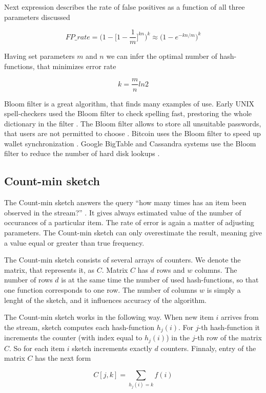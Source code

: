 Next expression describes the rate of false positives as a function of all three parameters discussed

$$
FP\_rate = \Bigg(1 - \Bigg[1 - \frac{1}{m}\Bigg]^{kn}\Bigg)^k \approx \Big(1 - e^{-kn/m}\Big)^k
$$

Having set parameters $m$ and $n$ we can infer the optimal number of hash-functions, that minimizes error rate

$$
k = \frac{m}{n}ln2
$$

Bloom filter is a great algorithm, that finds many examples of use.
Early UNIX spell-checkers used the Bloom filter to check spelling fast, prestoring the whole dictionary in the filter \cite{BroderMitzenmacher2005}.
The Bloom filter allows to store all unsuitable passwords, that users are not permitted to choose \cite{BroderMitzenmacher2005}.
Bitcoin uses the Bloom filter to speed up wallet synchronization \cite{BitcoinFoundation2012}.
Google BigTable and Cassandra systems use the Bloom filter to reduce the number of hard disk lookups \cite{Bigtable/Chang_Dean_Ghemawat}.

\subsection{Count-min sketch}

The Count-min sketch answers the query ``how many times has an item been observed in the stream?''  \cite{Cormode}.
It gives always estimated value of the number of occurances of a particular item.
The rate of error is again a matter of adjusting parameters.
The Count-min sketch can only overestimate the result, meaning give a value equal or greater than true frequency.

The Count-min sketch consists of several arrays of counters.
We denote the matrix, that represents it, as $C$.
Matrix $C$ has $d$ rows and $w$ columns.
The number of rows $d$ is at the same time the number of used hash-functions, so that one function corresponds to one row.
The number of columns $w$ is simply a lenght of the sketch, and it influences accuracy of the algorithm.

The Count-min sketch works in the following way.
When new item $i$ arrives from the stream, sketch computes each hash-function $h_j(i)$.
For $j$-th hash-function it increments the counter (with index equal to $h_j(i)$) in the $j$-th row of the matrix $C$.
So for each item $i$ sketch increments exactly $d$ counters.
Finnaly, entry of the matrix $C$ has the next form

$$
C[j, k] = \sum_{h_j(i)=k}f(i)
$$

